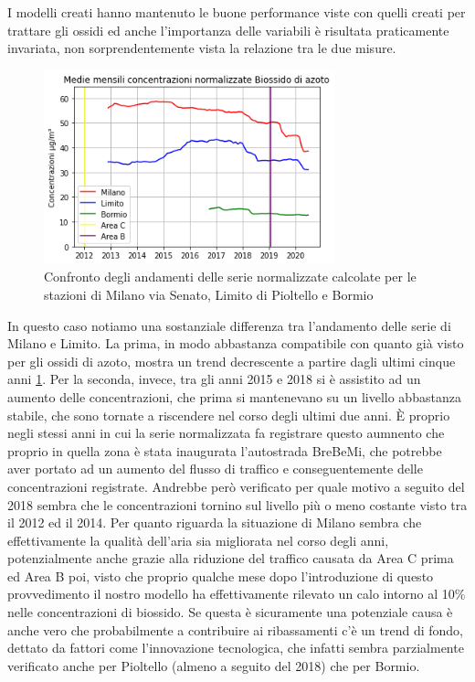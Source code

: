 \documentclass[a4paper]{report}
\begin{document}
I modelli creati hanno mantenuto le buone performance viste con quelli creati per trattare gli ossidi ed anche l'importanza delle variabili è risultata praticamente invariata, non sorprendentemente vista la relazione tra le due misure.

\begin{figure}[h]
\centering
\includegraphics[width=0.75\textwidth]{no2_traffico}
\caption{Confronto degli andamenti delle serie normalizzate calcolate per le stazioni di Milano via Senato, Limito di Pioltello e Bormio}
\label{fig:no2_traffico}
\end{figure}

In questo caso notiamo una sostanziale differenza tra l'andamento delle serie di Milano e Limito. La prima, in modo abbastanza compatibile con quanto già visto per gli ossidi di azoto, mostra un trend decrescente a partire dagli ultimi cinque anni \ref{fig:no2_traffico}. Per la seconda, invece, tra gli anni 2015 e 2018 si è assistito ad un aumento delle concentrazioni, che prima si mantenevano su un livello abbastanza stabile, che sono tornate a riscendere nel corso degli ultimi due anni. È proprio negli stessi anni in cui la serie normalizzata fa registrare questo aumnento che proprio in quella zona è stata inaugurata l'autostrada BreBeMi, che potrebbe aver portato ad un aumento del flusso di traffico e conseguentemente delle concentrazioni registrate. Andrebbe però verificato per quale motivo a seguito del 2018 sembra che le concentrazioni tornino sul livello più o meno costante visto tra il 2012 ed il 2014.
Per quanto riguarda la situazione di Milano sembra che effettivamente la qualità dell'aria sia migliorata nel corso degli anni, potenzialmente anche grazie alla riduzione del traffico causata da Area C prima ed Area B poi, visto che proprio qualche mese dopo l'introduzione di questo provvedimento il nostro modello ha effettivamente rilevato un calo intorno al 10\% nelle concentrazioni di biossido. Se questa è sicuramente una potenziale causa è anche vero che probabilmente a contribuire ai ribassamenti c'è un trend di fondo, dettato da fattori come l'innovazione tecnologica, che infatti sembra parzialmente verificato anche per Pioltello (almeno a seguito del 2018) che per Bormio.
\end{document}
